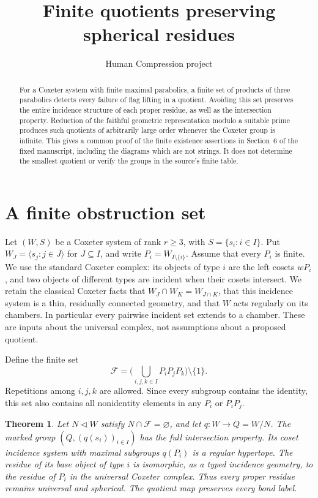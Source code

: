 \documentclass[11pt,a4paper]{article}
\title{Finite quotients preserving spherical residues}
\author{Human Compression project}
\date{}
\newtheorem{theorem}{Theorem}
\newcommand{\gen}[1]{\langle #1\rangle}
\begin{document}
\maketitle

\begin{abstract}
For a Coxeter system with finite maximal parabolics, a finite set of
products of three parabolics detects every failure of flag lifting in
a quotient. Avoiding this set preserves the entire incidence structure
of each proper residue, as well as the intersection property.
Reduction of the faithful geometric representation modulo a suitable
prime produces such quotients of arbitrarily large order whenever the
Coxeter group is infinite. This gives a common proof of the finite
existence assertions in Section~6 of the fixed manuscript, including
the diagrams which are not strings. It does not determine the smallest
quotient or verify the groups in the source's finite table.
\end{abstract}

\section{A finite obstruction set}

Let $(W,S)$ be a Coxeter system of rank $r\ge3$, with
$S=\{s_i:i\in I\}$. Put $W_J=\gen{s_j:j\in J}$ for $J\subseteq I$,
and write $P_i=W_{I\setminus\{i\}}$. Assume that every $P_i$ is finite.
We use the standard Coxeter complex: its objects of type $i$ are the
left cosets $wP_i$, and two objects of different types are incident
when their cosets intersect. We retain the classical Coxeter facts
that $W_J\cap W_K=W_{J\cap K}$, that this incidence system is a thin,
residually connected geometry, and that $W$ acts regularly on its
chambers. In particular every pairwise incident set extends to a
chamber. These are inputs about the universal complex, not assumptions
about a proposed quotient.

Define the finite set
\[
 \mathcal F=\biggl(\bigcup_{i,j,k\in I} P_iP_jP_k\biggr)
                 \setminus\{1\}.
\]
Repetitions among $i,j,k$ are allowed. Since every subgroup contains
the identity, this set also contains all nonidentity elements in any
$P_i$ or $P_iP_j$.

\begin{theorem}\label{lifting}
Let $N\triangleleft W$ satisfy $N\cap\mathcal F=\varnothing$, and
let $q:W\to Q=W/N$. The marked group
$(Q,(q(s_i))_{i\in I})$ has the full intersection property.
Its coset incidence system with maximal subgroups $q(P_i)$ is a
regular hypertope. The residue of its base object of type $i$ is
isomorphic, as a typed incidence geometry, to the residue of $P_i$
in the universal Coxeter complex. Thus every proper residue remains
universal and spherical. The quotient map preserves every bond label.
\end{theorem}
\end{document}
